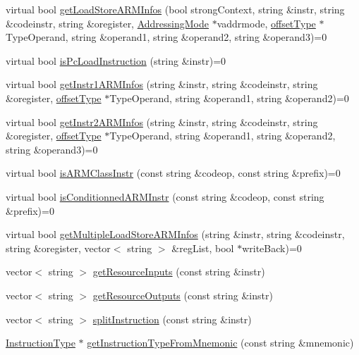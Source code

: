 \begin{DoxyCompactItemize}
\item 
virtual bool \hyperlink{classArch__dep_a18db69d3e03bcfbcf5b7d3b36b4f409c}{get\+Load\+Store\+A\+R\+M\+Infos} (bool strong\+Context, string \&instr, string \&codeinstr, string \&oregister, \hyperlink{arch_8h_aa5cfff0cd9c5ad5ebda7aeecc4a50c2b}{Addressing\+Mode} $\ast$vaddrmode, \hyperlink{arch_8h_a63b66e201ffc27bbc8f89c8808382044}{offset\+Type} $\ast$Type\+Operand, string \&operand1, string \&operand2, string \&operand3)=0
\item 
virtual bool \hyperlink{classArch__dep_aa96008928838f1ff0f96ba83b07b90e2}{is\+Pc\+Load\+Instruction} (string \&instr)=0
\item 
virtual bool \hyperlink{classArch__dep_a30cdbcdc129741df876bda79fd76e9fe}{get\+Instr1\+A\+R\+M\+Infos} (string \&instr, string \&codeinstr, string \&oregister, \hyperlink{arch_8h_a63b66e201ffc27bbc8f89c8808382044}{offset\+Type} $\ast$Type\+Operand, string \&operand1, string \&operand2)=0
\item 
virtual bool \hyperlink{classArch__dep_ae9c1e0474e6414808dc6c8658ef0ddba}{get\+Instr2\+A\+R\+M\+Infos} (string \&instr, string \&codeinstr, string \&oregister, \hyperlink{arch_8h_a63b66e201ffc27bbc8f89c8808382044}{offset\+Type} $\ast$Type\+Operand, string \&operand1, string \&operand2, string \&operand3)=0
\item 
virtual bool \hyperlink{classArch__dep_a71398abb52e277ead74615af892a2dd8}{is\+A\+R\+M\+Class\+Instr} (const string \&codeop, const string \&prefix)=0
\item 
virtual bool \hyperlink{classArch__dep_a41eb152029e2792b59337bc4b370ec9f}{is\+Conditionned\+A\+R\+M\+Instr} (const string \&codeop, const string \&prefix)=0
\item 
virtual bool \hyperlink{classArch__dep_a6d74b532181cea3a40eb28b262a9f6f5}{get\+Multiple\+Load\+Store\+A\+R\+M\+Infos} (string \&instr, string \&codeinstr, string \&oregister, vector$<$ string $>$ \&reg\+List, bool $\ast$write\+Back)=0
\item 
vector$<$ string $>$ \hyperlink{classArch__dep_a62ba8da6b630eaffc886affddb769a55}{get\+Resource\+Inputs} (const string \&instr)
\item 
vector$<$ string $>$ \hyperlink{classArch__dep_a09460de38072b0a85ac88f64f0ed42c2}{get\+Resource\+Outputs} (const string \&instr)
\item 
vector$<$ string $>$ \hyperlink{classArch__dep_af07d99baab6b3f496f50bd44277f762e}{split\+Instruction} (const string \&instr)
\item 
\hyperlink{classInstructionType}{Instruction\+Type} $\ast$ \hyperlink{classArch__dep_a842926338441fd9f65a8775450a1b811}{get\+Instruction\+Type\+From\+Mnemonic} (const string \&mnemonic)

\end{DoxyCompactItemize}

